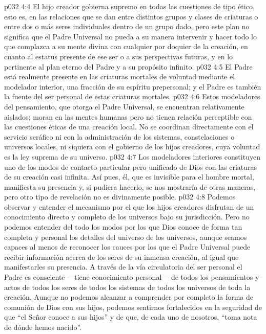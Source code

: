 \vs p032 4:4 El hijo creador gobierna supremo en todas las cuestiones de tipo ético, esto es, en las relaciones que se dan entre distintos grupos y clases de criaturas o entre dos o más seres individuales dentro de un grupo dado, pero este plan no significa que el Padre Universal no pueda a su manera intervenir y hacer todo lo que complazca a su mente divina con cualquier  por doquier de la creación, en cuanto al estatus presente de ese ser o a sus perspectivas futuras, y en lo pertinente al plan eterno del Padre y a su propósito infinito.
\vs p032 4:5 \pc El Padre está realmente presente en las criaturas mortales de voluntad mediante el modelador interior, una fracción de su espíritu prepersonal; y el Padre es también la fuente del ser personal de estas criaturas mortales.
\vs p032 4:6 \pc Estos modeladores del pensamiento, que otorga el Padre Universal, se encuentran relativamente aislados; moran en las mentes humanas pero no tienen relación perceptible con las cuestiones éticas de una creación local. No se coordinan directamente con el servicio seráfico ni con la administración de los sistemas, constelaciones o universos locales, ni siquiera con el gobierno de los hijos creadores, cuya voluntad es la ley suprema de su universo.
\vs p032 4:7 Los modeladores interiores constituyen uno de los modos de contacto particular pero unificado de Dios con las criaturas de su creación casi infinita. Así pues, él, que es invisible para el hombre mortal, manifiesta su presencia y, si pudiera hacerlo, se nos mostraría de otras maneras, pero otro tipo de revelación no es divinamente posible.
\vs p032 4:8 Podemos observar y entender el mecanismo por el que los hijos creadores disfrutan de un conocimiento directo y completo de los universos bajo su jurisdicción. Pero no podemos entender del todo los modos por los que Dios conoce de forma tan completa y personal los detalles del universo de los universos, aunque seamos capaces al menos de reconocer los cauces por los que el Padre Universal puede recibir información acerca de los seres de su inmensa creación, al igual que manifestarles su presencia. A través de la vía circulatoria del ser personal el Padre es consciente ---tiene conocimiento personal--- de todos los pensamientos y actos de todos los seres de todos los sistemas de todos los universos de toda la creación. Aunque no podemos alcanzar a comprender por completo la forma de comunión de Dios con sus hijos, podemos sentirnos fortalecidos en la seguridad de que “el Señor conoce a sus hijos” y de que, de cada uno de nosotros, “toma nota de dónde hemos nacido”.
